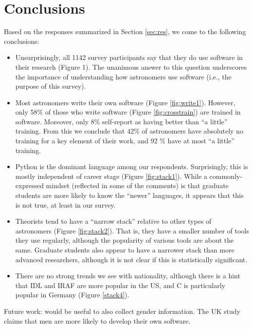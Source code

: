 
\section{Conclusions}
\label{sec:conc}


Based on the responses summarized in Section \ref{sec:res}, we come to the following conclusions:



\begin{itemize}
\item Unsurprisingly, all 1142 survey participants say that they do use software in their research (Figure 1). The unanimous answer to this question underscores the importance of understanding how astronomers use software (i.e., the purpose of this survey).
\item Most astronomers write their own software (Figure \ref{fig:write1}).  However, only 58\% of those who write software (Figure \ref{fig:crosstrain}) are trained in software.  Moreover, only 8\% self-report as having better than ``a little'' training.  From this we conclude that 42\% of astronomers have absolutely no training for a key element of their work, and 92 \% have at most ``a little'' training.  
\item Python is the dominant language among our respondents.  Surprisingly, this is mostly independent of career stage (Figure \ref{fig:stack1}).  While a commonly-expressed mindset (reflected in some of the comments) is that graduate students are more likely to know the ``newer'' languages, it appears that this is not true, at least in our survey.
\item Theorists tend to have a ``narrow stack'' relative to other types of astronomers (Figure \ref{fig:stack2}).  That is, they have a smaller number of tools they use regularly, although the popularity of various tools are about the same.  Graduate students also appear to have a narrower stack than more advanced researchers, although it is not clear if this is statistically significant. 
\item There are no strong trends we see with nationality, although there is a hint that IDL and IRAF are more popular in the US, and C is particularly popular in Germany (Figure \ref{stack4}).
\end{itemize}

Future work: would be useful to also collect gender information. The UK study claims that men are more likely to develop their own software. 